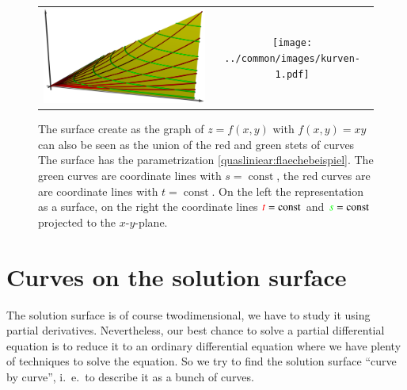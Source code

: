 %
%
%
\begin{figure}
\centering
\begin{tabular}{cc}
\includegraphics[width=0.6\hsize]{../common/3d/surface.jpg}&%
\texttt{[image: ../common/images/kurven-1.pdf]}
\end{tabular}
\caption{The surface create as the graph of $z=f(x,y)$ with $f(x,y)=xy$
can also be seen as the union of the red and green stets of curves
The surface has the parametrization \eqref{quasliniear:flaechebeispiel}.
The green curves are coordinate lines with $s=\operatorname{const}$,
the red curves are are coordinate lines with $t=\operatorname{const}$.
On the left the representation as a surface, on the right the coordinate
lines
${\color{red}t}=\operatorname{const}$
and
${\color{green}s}=\operatorname{const}$
projected to the $x$-$y$-plane.
\label{quasilinear:flaechenalskurven}
}
\end{figure}

\section{Curves on the solution surface}
The solution surface is of course twodimensional, we have to study it
using partial derivatives.
Nevertheless, our best chance to solve a partial differential equation is to 
reduce it to an ordinary differential equation where we have plenty
of techniques to solve the equation.
So we try to find the solution surface ``curve by curve'', i.~e.~to describe
it as a bunch of curves.

